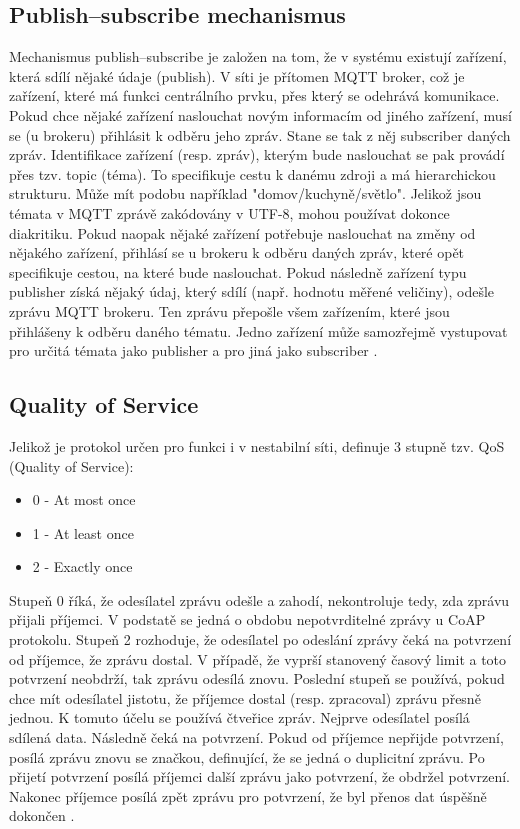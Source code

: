 \subsection*{Publish--subscribe mechanismus}
Mechanismus publish--subscribe je založen na tom, že v systému existují zařízení, která sdílí nějaké údaje (publish). V síti je přítomen MQTT broker, což je zařízení, které má funkci centrálního prvku, přes který se odehrává komunikace. 
Pokud chce nějaké zařízení naslouchat novým informacím od jiného zařízení, musí se (u brokeru) přihlásit k odběru jeho zpráv. Stane se tak z něj subscriber daných zpráv. Identifikace zařízení (resp. zpráv), kterým bude naslouchat se pak provádí přes tzv. topic (téma). To specifikuje cestu k danému zdroji a má hierarchickou strukturu. Může mít podobu například "domov/kuchyně/světlo". Jelikož jsou témata v MQTT zprávě zakódovány v UTF-8, mohou používat dokonce diakritiku.
Pokud naopak nějaké zařízení potřebuje naslouchat na změny od nějakého zařízení, přihlásí se u brokeru k odběru daných zpráv, které opět specifikuje cestou, na které bude naslouchat.
Pokud následně zařízení typu publisher získá nějaký údaj, který sdílí (např. hodnotu měřené veličiny), odešle zprávu MQTT brokeru. Ten zprávu přepošle všem zařízením, které jsou přihlášeny k odběru daného tématu.
Jedno zařízení může samozřejmě vystupovat pro určitá témata jako publisher a pro jiná jako subscriber \cite{RootMQTT}.

\subsection*{Quality of Service}
Jelikož je protokol určen pro funkci i v nestabilní síti, definuje 3 stupně tzv. QoS (Quality of Service):
\begin{itemize}
    \item 0 - At most once
    \item 1  - At least once
    \item 2 - Exactly once \cite{IoTQoS}
\end{itemize}

Stupeň 0 říká, že odesílatel zprávu odešle a zahodí, nekontroluje tedy, zda zprávu přijali příjemci. V podstatě se jedná o obdobu nepotvrditelné zprávy u CoAP protokolu.
Stupeň 2 rozhoduje, že odesílatel po odeslání zprávy čeká na potvrzení od příjemce, že zprávu dostal. V případě, že vyprší stanovený časový limit a toto potvrzení neobdrží, tak zprávu odesílá znovu.
Poslední stupeň se používá, pokud chce mít odesílatel jistotu, že příjemce dostal (resp. zpracoval) zprávu přesně jednou. K tomuto účelu se používá čtveřice zpráv. Nejprve odesílatel posílá sdílená data. Následně čeká na potvrzení. Pokud od příjemce nepřijde potvrzení, posílá zprávu znovu se značkou, definující, že se jedná o duplicitní zprávu. Po přijetí potvrzení posílá příjemci další zprávu jako potvrzení, že obdržel potvrzení. Nakonec příjemce posílá zpět zprávu pro potvrzení, že byl přenos dat úspěšně dokončen \cite{HiveMQ}.

